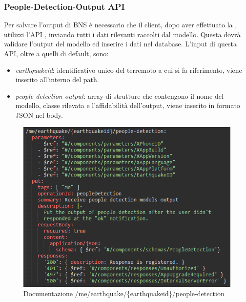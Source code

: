 \documentclass[main.tex]{subfiles}
\begin{document}
\subsubsection{People-Detection-Output API}
Per salvare l'output di BNS è necessario che il client, dopo aver effettuato la , utilizzi l'API , inviando tutti i dati rilevanti raccolti dal modello. Questa dovrà validare l'output del modello ed inserire i dati nel database. L'input di questa API, oltre a quelli di default, sono:
\begin{itemize}
    \item \emph{earthquakeid}: identificativo unico del terremoto a cui si fa riferimento, viene inserito all'interno del path.
    \item \emph{people-detection-output}: array di strutture che contengono il nome del modello, classe rilevata e l'affidabilità dell'output, viene inserito in formato JSON nel body.
\end{itemize}

\begin{figure}[H]
    \centering
    \includegraphics[width=1\linewidth]{img/Post-Earthquake/bns-output-openAPI-doc.PNG}
    \caption{Documentazione /me/earthquake/\{earthquakeid\}/people-detection}
    \label{fig:bns-output-doc}
\end{figure}
\end{document}
